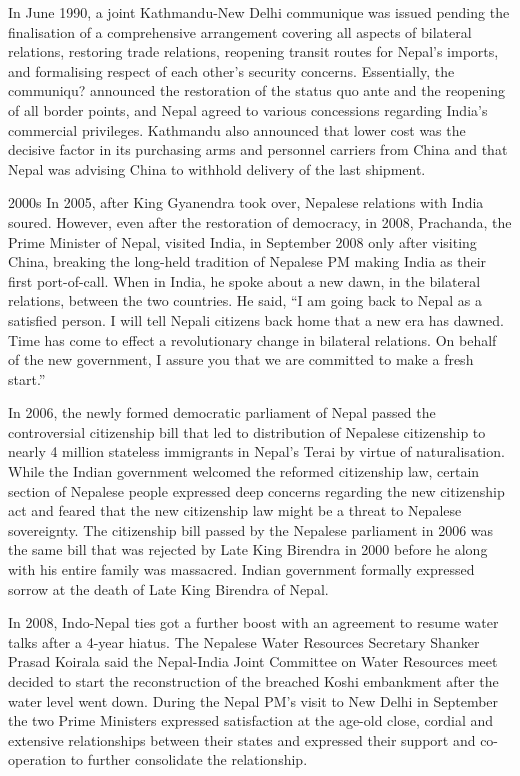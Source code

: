 \documentclass[
  openany]{book}
\begin{document}
In June 1990, a joint Kathmandu-New Delhi communique was issued pending the finalisation of a comprehensive arrangement covering all aspects of bilateral relations, restoring trade relations, reopening transit routes for Nepal's imports, and formalising respect of each other's security concerns. Essentially, the communiqu? announced the restoration of the status quo ante and the reopening of all border points, and Nepal agreed to various concessions regarding India's commercial privileges. Kathmandu also announced that lower cost was the decisive factor in its purchasing arms and personnel carriers from China and that Nepal was advising China to withhold delivery of the last shipment.

2000s
In 2005, after King Gyanendra took over, Nepalese relations with India soured. However, even after the restoration of democracy, in 2008, Prachanda, the Prime Minister of Nepal, visited India, in September 2008 only after visiting China, breaking the long-held tradition of Nepalese PM making India as their first port-of-call. When in India, he spoke about a new dawn, in the bilateral relations, between the two countries. He said, ``I am going back to Nepal as a satisfied person. I will tell Nepali citizens back home that a new era has dawned. Time has come to effect a revolutionary change in bilateral relations. On behalf of the new government, I assure you that we are committed to make a fresh start.''

In 2006, the newly formed democratic parliament of Nepal passed the controversial citizenship bill that led to distribution of Nepalese citizenship to nearly 4 million stateless immigrants in Nepal's Terai by virtue of naturalisation. While the Indian government welcomed the reformed citizenship law, certain section of Nepalese people expressed deep concerns regarding the new citizenship act and feared that the new citizenship law might be a threat to Nepalese sovereignty. The citizenship bill passed by the Nepalese parliament in 2006 was the same bill that was rejected by Late King Birendra in 2000 before he along with his entire family was massacred. Indian government formally expressed sorrow at the death of Late King Birendra of Nepal.

In 2008, Indo-Nepal ties got a further boost with an agreement to resume water talks after a 4-year hiatus. The Nepalese Water Resources Secretary Shanker Prasad Koirala said the Nepal-India Joint Committee on Water Resources meet decided to start the reconstruction of the breached Koshi embankment after the water level went down. During the Nepal PM's visit to New Delhi in September the two Prime Ministers expressed satisfaction at the age-old close, cordial and extensive relationships between their states and expressed their support and co-operation to further consolidate the relationship.
\end{document}
